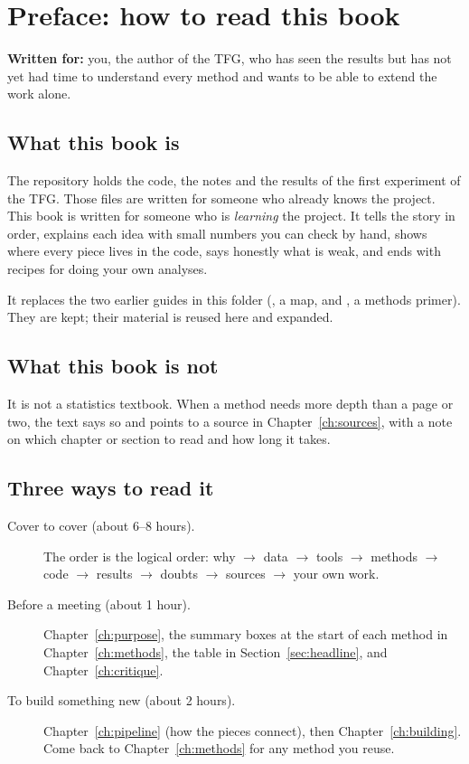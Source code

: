 \chapter*{Preface: how to read this book}

\textbf{Written for:} you, the author of the TFG, who has seen the results but has not yet had time to understand every method and wants to be able to extend the work alone.

\section*{What this book is}
The repository holds the code, the notes and the results of the first experiment of the TFG. Those files are written for someone who already knows the project. This book is written for someone who is \emph{learning} the project. It tells the story in order, explains each idea with small numbers you can check by hand, shows where every piece lives in the code, says honestly what is weak, and ends with recipes for doing your own analyses.

It replaces the two earlier guides in this folder (, a map, and , a methods primer). They are kept; their material is reused here and expanded.

\section*{What this book is not}
It is not a statistics textbook. When a method needs more depth than a page or two, the text says so and points to a source in Chapter~\ref{ch:sources}, with a note on which chapter or section to read and how long it takes.

\section*{Three ways to read it}
\begin{description}
  \item[Cover to cover (about 6--8 hours).] The order is the logical order: why $\to$ data $\to$ tools $\to$ methods $\to$ code $\to$ results $\to$ doubts $\to$ sources $\to$ your own work.
  \item[Before a meeting (about 1 hour).] Chapter~\ref{ch:purpose}, the summary boxes at the start of each method in Chapter~\ref{ch:methods}, the table in Section~\ref{sec:headline}, and Chapter~\ref{ch:critique}.
  \item[To build something new (about 2 hours).] Chapter~\ref{ch:pipeline} (how the pieces connect), then Chapter~\ref{ch:building}. Come back to Chapter~\ref{ch:methods} for any method you reuse.
\end{description}

